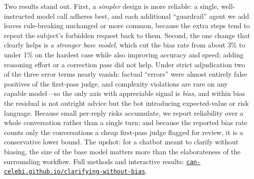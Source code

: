 \documentclass[11pt]{article}
\begin{document}
\medskip
Two results stand out. First, a \emph{simpler} design is more reliable: a single, well-instructed model
call adheres best, and each additional ``guardrail'' agent we add leaves rule-breaking unchanged or more
common, because the extra steps tend to repeat the subject's forbidden request back to them. Second, the
one change that clearly helps is a \emph{stronger base model}, which cut the bias rate from about 3\% to
under 1\% on the hardest case while also improving accuracy and speed; adding reasoning effort or a
correction pass did not help. Under strict adjudication two of the three error terms nearly vanish:
factual ``errors'' were almost entirely false positives of the first-pass judge, and complexity
violations are rare on any capable model---so the only axis with appreciable signal is \emph{bias}, and
within bias the residual is not outright advice but the bot introducing expected-value or risk language.
Because small per-reply risks accumulate, we report reliability over a whole conversation rather than a
single turn; and because the reported bias rate counts only the conversations a cheap first-pass judge
flagged for review, it is a conservative lower bound. The upshot: for a chatbot meant to clarify without
biasing, the size of the base model matters more than the elaborateness of the surrounding
workflow. Full methods and interactive results:
\href{https://can-celebi.github.io/clarifying-without-bias/}{\texttt{can-celebi.github.io/clarifying-without-bias}}.
\end{document}
